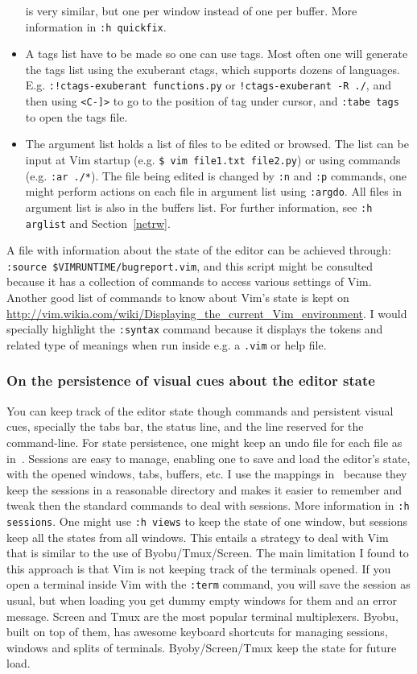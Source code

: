 \documentclass{article}
\newcommand{\ttt}[1] {
	\texttt{<#1>}}
\newcommand{\tttt}[1] {
	\texttt{#1}}
\begin{document}
\begin{itemize}
		is very similar, but one per window instead of one per buffer.
		More information in \tttt{:h quickfix}.
	\item A tags list have to be made so one can use tags.
		Most often one will generate the tags list using the exuberant ctags,
		which supports dozens of languages.
		E.g. \tttt{:!ctags-exuberant functions.py} or \tttt{!ctags-exuberant -R ./},
		and then using \ttt{C-]} to
		go to the position of tag under cursor, and \tttt{:tabe tags} to open
		the tags file.
	\item The argument list holds a list of files to be edited or browsed. 
		The list can be input at Vim startup (e.g. \tttt{\$ vim file1.txt file2.py})
	or using commands (e.g. \tttt{:ar ./*}).
		The file being edited is changed by \tttt{:n} and \tttt{:p} commands,
		one might perform actions on each file in argument list using \tttt{:argdo}.
		All files in argument list is also in the buffers list.
    For further information, see \tttt{:h arglist} and Section~\ref{netrw}.
\end{itemize}

A file with information about the state of the editor
can be achieved through: \tttt{:source \$VIMRUNTIME/bugreport.vim},
and this script might be consulted because it has
a collection of commands to access various settings of Vim.
Another good list of commands to know about Vim's state is kept on
\url{http://vim.wikia.com/wiki/Displaying_the_current_Vim_environment}.
I would specially highlight the \tttt{:syntax} command because
it displays the tokens and related type of meanings when run
inside e.g. a \tttt{.vim} or help file.

\subsubsection{On the persistence of visual cues about the editor state}\label{visual1}

You can keep track of the editor state though commands and persistent visual
cues, specially the tabs bar, the status line, and the line
reserved for the command-line.
For state persistence, one might keep an undo file for each file as
in~\cite{vimrc}.
Sessions are easy to manage, enabling one to save and load the
editor's state, with the opened windows, tabs, buffers, etc.
I use the mappings in~\cite{vimrc} because they keep the sessions
in a reasonable directory and makes it easier to remember and tweak
then the standard commands to deal with sessions.
More information in \tttt{:h sessions}.
One might use \tttt{:h views} to keep the state of one window,
but sessions keep all the states from all windows.
This entails a strategy to deal with Vim that is similar to
the use of Byobu/Tmux/Screen.
The main limitation I found to this approach is that
Vim is not keeping track of the terminals opened.
If you open a terminal inside Vim with the \tttt{:term}
command, you will save the session as usual, but when loading
you get dummy empty windows for them and an error message.
Screen and Tmux are the most popular terminal multiplexers.
Byobu, built on top of them, has awesome keyboard shortcuts
for managing sessions, windows and splits of terminals.
Byoby/Screen/Tmux keep the state for future load.
\end{document}
